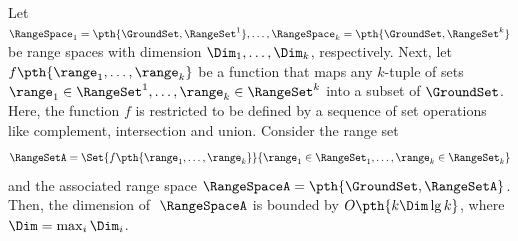 \begin{theorem}
        Let
        $\RangeSpace_1 = \pth{\GroundSet,\RangeSet^1}, \ldots,
        \RangeSpace_k = \pth{\GroundSet,\RangeSet^k}$
        be range spaces with \VC dimension $\Dim_1, \ldots, \Dim_k$,
        respectively.  Next, let $f\pth{ \range_1, \ldots, \range_k}$
        be a function that maps any $k$-tuple of sets
        $\range_1 \in \RangeSet^1, \ldots, \range_k \in \RangeSet^k$
        into a subset of $\GroundSet$. Here, the function $f$ is
        restricted to be defined by a sequence of set operations like
        complement, intersection and union.  Consider the range set
        \begin{align*}
          \RangeSetA%
          =%
          \Set{ f\pth{ \range_1, \ldots, \range_k}}{ \range_1
          \in \RangeSet_1, \ldots, \range_k \in \RangeSet_k \bigr.}
        \end{align*}
        and the associated range space $\RangeSpaceA =
        \pth{\GroundSet, \RangeSetA}$. Then, the \VC dimension of
        $\;\RangeSpaceA$ is bounded by $O\pth{ k \Dim \lg k}$, where
        $\Dim = \max_i \Dim_i$.
        
    \end{theorem}
